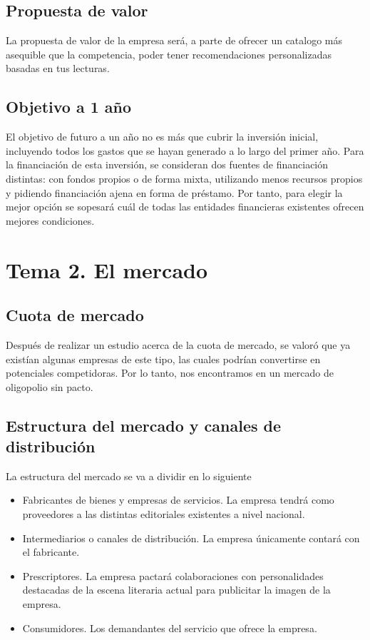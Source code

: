 \documentclass[openany,overnay,a4paper, twoside, 12pt]{book}
\begin{document}
\section{Propuesta de valor}
La propuesta de valor de la empresa será, a parte de ofrecer un catalogo más asequible que la competencia, poder tener recomendaciones personalizadas basadas en tus lecturas. 

\section{Objetivo a 1 año}
El objetivo de futuro a un año no es más que cubrir la inversión inicial, incluyendo todos los gastos que se hayan generado a lo largo del primer año. Para la financiación de esta inversión, se consideran dos fuentes de financiación distintas: con fondos propios o de forma mixta, utilizando menos recursos propios y pidiendo financiación ajena en forma de préstamo. Por tanto, para elegir la mejor opción se sopesará cuál de todas las entidades financieras existentes ofrecen mejores condiciones.

\setcounter{chapter}{2} %
\chapter*{Tema 2. El mercado}

\setcounter{section}{0}
\section{Cuota de mercado}

Después de realizar un estudio acerca de la cuota de mercado, se valoró que ya existían algunas empresas de este tipo, las cuales podrían convertirse en potenciales competidoras. Por lo tanto, nos encontramos en un mercado de oligopolio sin pacto.

\section{Estructura del mercado y canales de distribución}
La estructura del mercado se va a dividir en lo siguiente
\begin{itemize}
\item Fabricantes de bienes y empresas de servicios. La empresa tendrá como proveedores a las distintas editoriales existentes a nivel nacional.
\item Intermediarios o canales de distribución. La empresa únicamente contará con el fabricante.
\item Prescriptores. La empresa pactará colaboraciones con personalidades destacadas de la escena literaria actual para publicitar la imagen de la empresa.
\item Consumidores. Los demandantes del servicio que ofrece la empresa.
\end{itemize}
\end{document}
